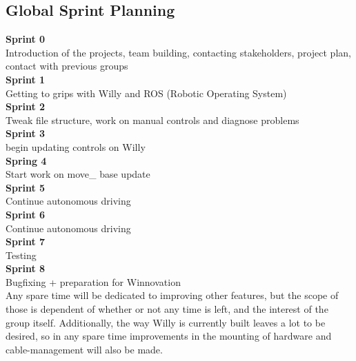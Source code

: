 \subsection{Global Sprint Planning}
\noindent \textbf{Sprint 0}\\
Introduction of the projects, team building, contacting stakeholders, project plan, contact with previous groups\\
\textbf{Sprint 1}\\
Getting to grips with Willy and ROS (Robotic Operating System)\\
\textbf{Sprint 2}\\
Tweak file structure, work on manual controls and diagnose problems\\
\textbf{Sprint 3}\\
begin updating controls on Willy\\
\textbf{Spring 4}\\
Start work on move\_ base update\\
\textbf{Sprint 5}\\
Continue autonomous driving\\
\textbf{Sprint 6} \\
Continue autonomous driving\\
\textbf{Sprint 7}\\
Testing\\
\textbf{Sprint 8}\\
Bugfixing + preparation for Winnovation \\

Any spare time will be dedicated to improving other features, but the scope of those is dependent of whether or not any time is left, and the interest of the group itself.
Additionally, the way Willy is currently built leaves a lot to be desired, so in any spare time improvements in the mounting of hardware and cable-management will also be made.

\newpage
